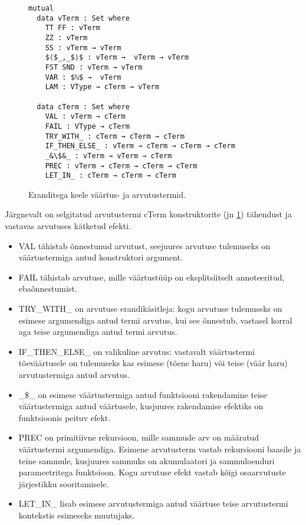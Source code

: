 \documentclass[a4paper,12pt]{article}
\begin{document}
\begin{figure}
  \begin{lstlisting}
mutual
  data vTerm : Set where
    TT FF : vTerm
    ZZ : vTerm
    SS : vTerm → vTerm
    $⟨$_,_$⟩$ : vTerm →  vTerm → vTerm
    FST SND : vTerm → vTerm
    VAR : $ℕ$ →  vTerm
    LAM : VType → cTerm → vTerm

  data cTerm : Set where
    VAL : vTerm → cTerm
    FAIL : VType → cTerm
    TRY_WITH_ : cTerm → cTerm → cTerm
    IF_THEN_ELSE_ : vTerm → cTerm → cTerm → cTerm
    _&\$&_ : vTerm → vTerm → cTerm
    PREC : vTerm → cTerm → cTerm → cTerm
    LET_IN_ : cTerm → cTerm → cTerm

  \end{lstlisting}
  \caption{Eranditega keele väärtus- ja arvutustermid.}
  \label{fig:exc.raw}
\end{figure}

Järgnevalt on selgitatud arvutustermi cTerm konstruktorite (jn \ref{fig:exc.raw}) tähendust ja vastavas arvutuses kätketud efekti.
\begin{itemize}
  \item VAL tähistab õnnestunud arvutust, seejuures arvutuse tulemuseks on väärtustermiga antud konstruktori argument.
  \item FAIL tähistab arvutuse, mille väärtustüüp on eksplitsiitselt annoteeritud, ebaõnnestumist.
  \item TRY_WITH_ on arvutuse erandikäsitleja: kogu arvutuse tulemuseks on esimese argumendiga antud termi arvutus, kui see õnnestub, vastasel korral aga teise argumendiga antud termi arvutus.
  \item IF_THEN_ELSE_ on valikuline arvutus: vastavalt väärtustermi tõeväärtusele on tulemuseks kas esimese (tõene haru) või teise (väär haru) arvutustermiga antud arvutus.
  \item _\$_ on esimese väärtustermiga antud funktsiooni rakendamine teise väärtustermiga antud väärtusele, kusjuures rakendamise efektiks on funktsioonis peituv efekt.
  \item PREC on primitiivne rekursioon, mille sammude arv on määratud väärtustermi argumendiga. Esimene arvutusterm vastab rekursiooni baasile ja teine sammule, kusjuures sammuks on akumulaatori ja sammuloenduri parameetritega funktsioon. Kogu arvutuse efekt vastab kõigi osaarvutuste järjestikku sooritamisele.
  \item LET_IN_ lisab esimese arvutustermiga antud väärtuse teise arvutustermi kontekstis esimeseks muutujaks.
\end{itemize}
\end{document}
